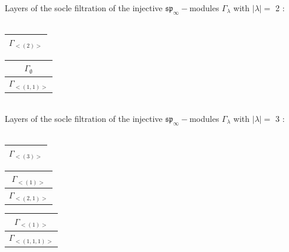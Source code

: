 \bigskip
Layers of the socle filtration of the injective $\mathfrak{sp}_\infty-$modules $\Gamma_{\lambda}$ with $|\lambda| = $ 2 : \\\\
\begin{minipage}{.5\textwidth}
\centering
\begin{tabular}{|c|}\hline
$\Gamma_{<(
2
)>}$
\\
\hline\end{tabular}\end{minipage}
\begin{minipage}{.5\textwidth}
\centering
\begin{tabular}{|c|}\hline
$\Gamma_\emptyset$
\\ \hline
$\Gamma_{<(
1 , 
1
)>}$
\\
\hline\end{tabular}\end{minipage}
\\




\bigskip
Layers of the socle filtration of the injective $\mathfrak{sp}_\infty-$modules $\Gamma_{\lambda}$ with $|\lambda| = $ 3 : \\\\
\begin{minipage}{.33\textwidth}
\centering
\begin{tabular}{|c|}\hline
$\Gamma_{<(
3
)>}$
\\
\hline\end{tabular}\end{minipage}
\begin{minipage}{.33\textwidth}
\centering
\begin{tabular}{|c|}\hline
$\Gamma_{<(
1
)>}$
\\ \hline
$\Gamma_{<(
2 , 
1
)>}$
\\
\hline\end{tabular}\end{minipage}
\begin{minipage}{.33\textwidth}
\centering
\begin{tabular}{|c|}\hline
$\Gamma_{<(
1
)>}$
\\ \hline
$\Gamma_{<(
1 , 
1 , 
1
)>}$
\\
\hline\end{tabular}\end{minipage}
\\



